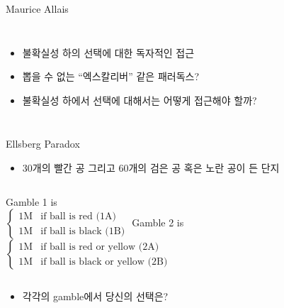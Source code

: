 \documentclass[final]{beamer}
\begin{document}
\begin{frame}[t]{Maurice Allais}
	\begin{columns}[c]
	\column{18em}
	\begin{itemize}
		\item 불확실성 하의 선택에 대한 독자적인 접근 
		\item 뽑을 수 없는 ``엑스칼리버'' 같은 패러독스?
		\item 불확실성 하에서 선택에 대해서는 어떻게 접근해야 할까? 
	\end{itemize}
	\column{12em}
	\end{columns}
\end{frame}

\begin{frame}[t]{Ellsberg Paradox}
	\begin{itemize}
	\item 30개의 빨간 공 그리고 60개의 검은 공 혹은 노란 공이 든 단지
	\end{itemize}
	\vspace{1em}
	\begin{columns}[c]
	\column{11em}
	Gamble 1 is \\[1em]
	$
	\begin{cases}
	\text{1M}& \text{if ball is red (1A)} \\
	\text{1M}& \text{if ball is black (1B)}
	\end{cases}
	$
	\column{15em}
	Gamble 2 is \\[1em]
	$
	\begin{cases}
	\text{1M}& \text{if ball is red or yellow (2A)} \\
	\text{1M}& \text{if ball is black or yellow (2B)}
	\end{cases}
	$
	\end{columns}
	\vspace{1.5em}
	\begin{itemize}
	\item 각각의 gamble에서 당신의 선택은? 
	\end{itemize}
\end{frame}
\end{document}
